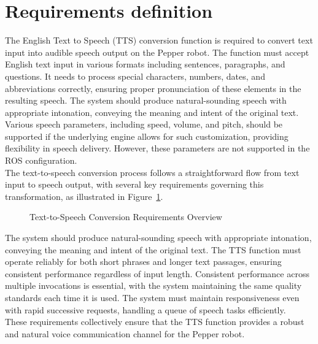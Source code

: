 \documentclass{CSSRforAfrica}
\begin{document}

 
\newpage
\section{ Requirements definition}
The English Text to Speech (TTS) conversion function is required to convert text input into audible speech output on the Pepper robot. The function must accept English text input in various formats including sentences, paragraphs, and questions. It needs to process special characters, numbers, dates, and abbreviations correctly, ensuring proper pronunciation of these elements in the resulting speech.
The system should produce natural-sounding speech with appropriate intonation, conveying the meaning and intent of the original text. Various speech parameters, including speed, volume, and pitch, should be supported if the underlying engine allows for such customization, providing flexibility in speech delivery. However, these parameters are not supported in the ROS configuration. \\
The text-to-speech conversion process follows a straightforward flow from text input to speech output, with several key requirements governing this transformation, as illustrated in Figure~\ref{fig:tts-requirements}.

\begin{figure}[htbp]
    \centering
    \caption{Text-to-Speech Conversion Requirements Overview}
    \label{fig:tts-requirements}
\end{figure}

The system should produce natural-sounding speech with appropriate intonation, conveying the meaning and intent of the original text.
The TTS function must operate reliably for both short phrases and longer text passages, ensuring consistent performance regardless of input length. Consistent performance across multiple invocations is essential, with the system maintaining the same quality standards each time it is used. The system must maintain responsiveness even with rapid successive requests, handling a queue of speech tasks efficiently.\\
These requirements collectively ensure that the TTS function provides a robust and natural voice communication channel for the Pepper robot. \\
\end{document}
